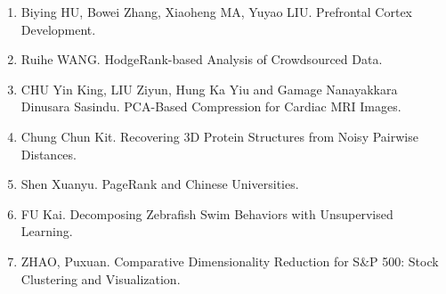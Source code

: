 \documentclass[11pt]{article}
\begin{document}
\begin{enumerate}
\item Biying HU, Bowei Zhang, Xiaoheng MA, Yuyao LIU. Prefrontal Cortex Development. \\
\item Ruihe WANG. HodgeRank-based Analysis of Crowdsourced Data. \\
\item CHU Yin King, LIU Ziyun, Hung Ka Yiu and Gamage Nanayakkara Dinusara Sasindu. PCA-Based Compression for Cardiac MRI Images. \\
\item Chung Chun Kit. Recovering 3D Protein Structures from Noisy Pairwise Distances. \\
\item Shen Xuanyu. PageRank and Chinese Universities. \\
\item FU Kai. Decomposing Zebrafish Swim Behaviors with Unsupervised Learning. \\
\item ZHAO, Puxuan. Comparative Dimensionality Reduction for S\&P 500: Stock Clustering and Visualization. \\
\end{enumerate}

%
%
%
\end{document}
